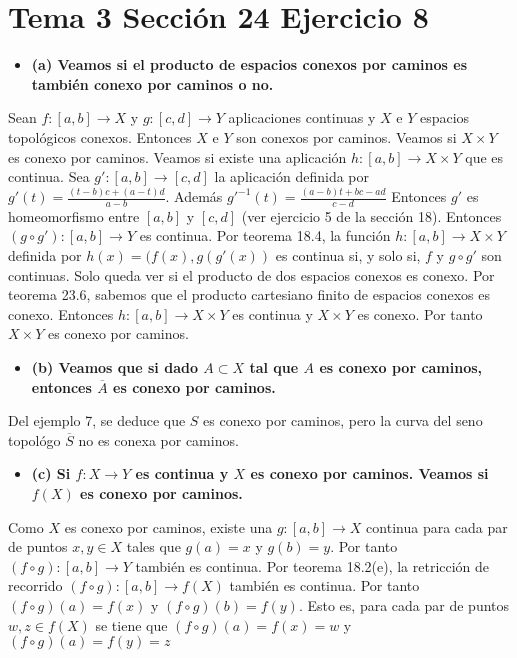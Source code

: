 \documentclass{article}
\begin{document}
\section{Tema 3 Sección 24 Ejercicio 8}
\begin{itemize}
\item \bf (a) \rm Veamos si el producto de espacios conexos por caminos es también conexo por caminos o no.
\end{itemize}
Sean $f:[a,b]\rightarrow X$ y $g:[c,d]\rightarrow Y$ aplicaciones continuas y $X$ e $Y$ espacios topológicos conexos. Entonces $X$ e $Y$ son conexos por caminos. Veamos si $X\times Y$ es conexo por caminos. Veamos si existe una aplicación $h:[a,b]\rightarrow X\times Y$ que es continua. Sea $g':[a,b]\rightarrow [c,d]$ la aplicación definida por $g'(t)= \frac{(t-b)c+(a-t)d}{a-b}$. Además $g'^{-1}(t)=\frac{(a-b)t+bc-ad}{c-d}$ Entonces $g'$ es homeomorfismo entre $[a,b]$ y $[c,d]$ (ver ejercicio 5 de la sección 18). Entonces $(g\circ g'):[a,b]\rightarrow Y$ es continua. Por teorema 18.4, la función $h:[a,b]\rightarrow X\times Y$ definida por $h(x)=(f(x), g(g'(x))$ es continua si, y solo si, $f$ y $g\circ g'$ son continuas. Solo queda ver si el producto de dos espacios conexos es conexo. Por teorema 23.6, sabemos que el producto cartesiano finito de espacios conexos es conexo. Entonces $h:[a,b]\rightarrow X\times Y$ es continua y $X\times Y$ es conexo. Por tanto $X\times Y$ es conexo por caminos.
\begin{itemize}
\item \bf (b) \rm Veamos que si dado $A\subset X$ tal que $A$ es conexo por caminos, entonces $\overline{A}$ es conexo por caminos.
\end{itemize}
Del ejemplo 7, se deduce que $S$ es conexo por caminos, pero la curva del seno topológo $\overline{S}$ no es conexa por caminos.
\begin{itemize}
\item \bf (c) \rm Si $f:X\rightarrow Y$ es continua y $X$ es conexo por caminos. Veamos si $f(X)$ es conexo por caminos.
\end{itemize}
Como $X$ es conexo por caminos, existe una $g:[a,b]\rightarrow X$ continua para cada par de puntos  $x,y\in X$ tales que $g(a)=x$ y $g(b)=y$. Por tanto $(f\circ g):[a,b]\rightarrow Y$ también es continua. Por teorema 18.2(e), la retricción de recorrido $(f\circ g):[a,b]\rightarrow f(X)$ también es continua. Por tanto $(f\circ g)(a)= f(x)$ y $(f\circ g)(b)= f(y)$. Esto es, para cada par de puntos $w,z\in f(X)$ se tiene que $(f\circ g)(a)= f(x)=w$ y $(f\circ g)(a)= f(y)=z$
\end{document}
